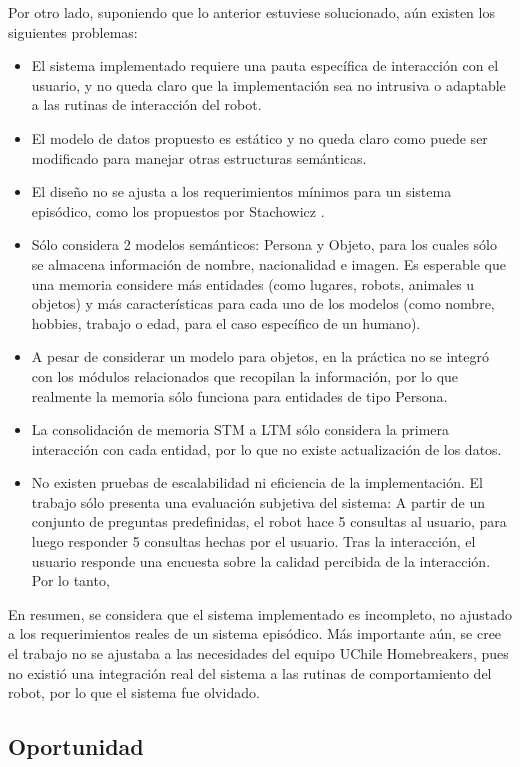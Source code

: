 Por otro lado, suponiendo que lo anterior estuviese solucionado, aún existen los siguientes problemas:
\begin{itemize}
	\item El sistema implementado requiere una pauta específica de interacción con el usuario, y no queda claro que la implementación sea no intrusiva o adaptable a las rutinas de interacción del robot. 
	\item El modelo de datos propuesto es estático y no queda claro como puede ser modificado para manejar otras estructuras semánticas.
	\item El diseño no se ajusta a los requerimientos mínimos para un sistema episódico, como los propuestos por Stachowicz \cite{Stachowicz2012}.
	\item Sólo considera 2 modelos semánticos: Persona y Objeto, para los cuales sólo se almacena información de nombre, nacionalidad e imagen. Es esperable que una memoria considere más entidades (como lugares, robots, animales u objetos) y más características para cada uno de los modelos (como nombre, hobbies, trabajo o edad, para el caso específico de un humano).
	\item A pesar de considerar un modelo para objetos, en la práctica no se integró con los módulos relacionados que recopilan la información, por lo que realmente la memoria sólo funciona para entidades de tipo Persona.
	\item La consolidación de memoria STM a LTM sólo considera la primera interacción con cada entidad, por lo que no existe actualización de los datos.
	\item No existen pruebas de escalabilidad ni eficiencia de la implementación. El trabajo sólo presenta una evaluación subjetiva del sistema: A partir de un conjunto de preguntas predefinidas, el robot hace 5 consultas al usuario, para luego responder 5 consultas hechas por el usuario. Tras la interacción, el usuario responde una encuesta sobre la calidad percibida de la interacción. Por lo tanto, 
\end{itemize}

En resumen, se considera que el sistema implementado es incompleto, no ajustado a los requerimientos reales de un sistema episódico. Más importante aún, se cree el trabajo no se ajustaba a las necesidades del equipo UChile Homebreakers, pues no existió una integración real del sistema a las rutinas de comportamiento del robot, por lo que el sistema fue olvidado.

\subsection{Oportunidad}

